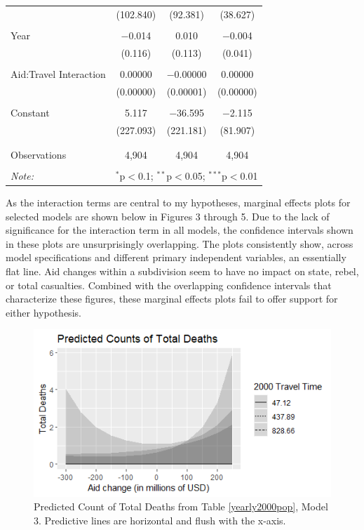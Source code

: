 \documentclass[12pt, letterpaper]{article}
\begin{document}
\begin{table}[!htbp]
\begin{tabular}{@{\extracolsep{5pt}}lccc}
		& (102.840) & (92.381) & (38.627) \\ 
		& & & \\ 
		Year & $-$0.014 & 0.010 & $-$0.004 \\ 
		& (0.116) & (0.113) & (0.041) \\ 
		& & & \\ 
		Aid:Travel Interaction & 0.00000 & $-$0.00000 & 0.00000 \\ 
		& (0.00000) & (0.00001) & (0.00000) \\ 
		& & & \\ 
		Constant & 5.117 & $-$36.595 & $-$2.115 \\ 
		& (227.093) & (221.181) & (81.907) \\ 
		& & & \\ 
		\hline \\[-1.8ex] 
		Observations & 4,904 & 4,904 & 4,904 \\ 
		\hline 
		\hline \\[-1.8ex] 
		\textit{Note:}  & \multicolumn{3}{r}{$^{*}$p$<$0.1; $^{**}$p$<$0.05; $^{***}$p$<$0.01} \\ 
	\end{tabular} 
	\label{weighted2015}
\end{table}

\newpage

As the interaction terms are central to my hypotheses, marginal effects plots for selected models are shown below in Figures 3 through 5. Due to the lack of significance for the interaction term in all models, the confidence intervals shown in these plots are unsurprisingly overlapping. The plots consistently show, across model specifications and different primary independent variables, an essentially flat line. Aid changes within a subdivision seem to have no impact on state, rebel, or total casualties. Combined with the overlapping confidence intervals that characterize these figures, these marginal effects plots fail to offer support for either hypothesis.

\begin{figure}
	\includegraphics[scale=1]{quasi_pop_tot_00_mfx}
	\caption{Predicted Count of Total Deaths from Table \ref{yearly2000pop}, Model 3. Predictive lines are horizontal and flush with the x-axis.}
\end{figure}
\end{document}
